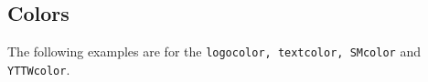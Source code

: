 \documentclass{ltxdoc}
\begin{document}
\subsection{Colors}
The following examples are for the \verb|logocolor, textcolor, SMcolor| and\\ \verb|YTTWcolor|. 
\begin{figure}[h]
    \centering
    \begin{subfigure}[b]{0.45\textwidth}
    \colorbox{white}{\parbox[c][0.3\textwidth][c]{\textwidth}{%
        \centering 
        \huaslogo}}    
        \caption*{\cmd{\huaslogo}}
    \end{subfigure}
    \begin{subfigure}[b]{0.45\textwidth}
    \colorbox{gray!20}{\parbox[c][0.3\textwidth][c]{\textwidth}{%
        \centering 
        \huaslogo}}    
        \caption*{\cmd{\huaslogo}}
    \end{subfigure}
\end{figure}
\begin{figure}[h]
    \centering
    \begin{subfigure}[b]{0.45\textwidth}
    \colorbox{huasorange}{\parbox[c][0.3\textwidth][c]{\textwidth}{%
        \centering 
        \huaslogo[logocolor = white]}}    
        \caption*{\cmd{\huaslogo[logocolor = white]}}
    \end{subfigure}
    \begin{subfigure}[b]{0.45\textwidth}
    \colorbox{black}{\parbox[c][0.3\textwidth][c]{\textwidth}{%
        \centering 
        \huaslogo[textcolor = white]}}    
        \caption*{\cmd{\huaslogo[textcolor = white]}}
    \end{subfigure}
\end{figure}
\begin{figure}[h]
    \centering
    \begin{subfigure}[b]{0.45\textwidth}
    \colorbox{black}{\parbox[c][0.3\textwidth][c]{\textwidth}{%
        \centering 
        \huaslogo[logocolor = white, textcolor = white]}}    
        \caption*{\cmd{\huaslogo[logocolor = white, textcolor = white]}}
    \end{subfigure}
    \begin{subfigure}[b]{0.45\textwidth}
    \colorbox{white}{\parbox[c][0.3\textwidth][c]{\textwidth}{%
        \centering 
        \huaslogo[textcolor = black, logocolor = black]}}    
        \caption*{\cmd{\huaslogo[logocolor = black, textcolor = black]}}
    \end{subfigure}
\end{figure}
\end{document}

